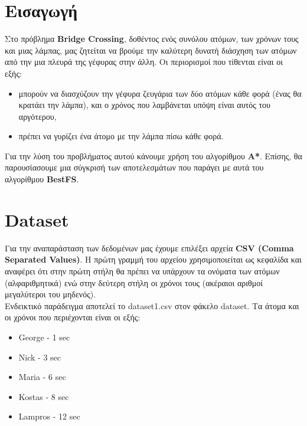 \documentclass[12pt]{article}
\begin{document}
    
\section*{Εισαγωγή}
Στο πρόβλημα \textbf{Bridge Crossing}, δοθέντος ενός συνόλου ατόμων, των χρόνων τους και μιας λάμπας, μας ζητείται να βρούμε την καλύτερη δυνατή διάσχηση των ατόμων από την μια πλευρά της γέφυρας στην άλλη. Οι περιορισμοί που τίθενται είναι οι εξής:
\begin{itemize}
    \item μπορούν να διασχύζουν την γέφυρα ζευγάρια των δύο ατόμων κάθε φορά (ένας θα κρατάει την λάμπα), και ο χρόνος που λαμβάνεται υπόψη είναι αυτός του αργότερου,
    \item πρέπει να γυρίζει ένα άτομο με την λάμπα πίσω κάθε φορά.
\end{itemize}
Για την λύση του προβλήματος αυτού κάνουμε χρήση του αλγορίθμου \textbf{A*}. Eπίσης, θα παρουσίασουμε μια σύγκρισή των αποτελεσμάτων που παράγει με αυτά του αλγορίθμου \textbf{BestFS}.
\section*{Dataset}
Για την αναπαράσταση των δεδομένων μας έχουμε επιλέξει αρχεία \textbf{CSV (Comma Separated Values)}. Η πρώτη γραμμή του αρχείου χρησιμοποιείται ως κεφαλίδα και αναφέρει ότι στην πρώτη στήλη θα πρέπει να υπάρχουν τα ονόματα των ατόμων (αλφαριθμητικά) ενώ στην δεύτερη στήλη οι χρόνοι τους (ακέραιοι αριθμοί μεγαλύτεροι του μηδενός).\\
Ενδεικτικό παράδειγμα αποτελεί το dataset1.csv στον φάκελο dataset. Τα άτομα και οι χρόνοι που περιέχονται είναι οι εξής:
\begin{itemize}
    \item George - 1 sec
    \item Nick - 3 sec
    \item Maria - 6 sec
    \item Kostas - 8 sec
    \item Lampros - 12 sec
\end{itemize}
\end{document}
